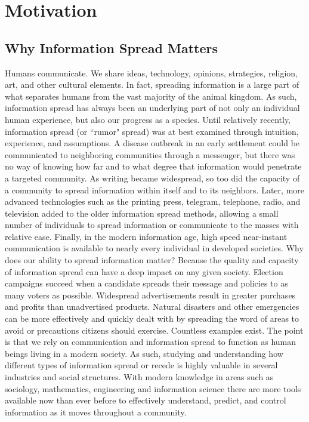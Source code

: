 \chapter{Motivation} \label{chapter_motivation}

\section{Why Information Spread Matters}
Humans communicate. We share ideas, technology, opinions, strategies, religion, art, and other cultural elements. In fact, spreading information is a large part of what separates humans from the vast majority of the animal kingdom. As such, information spread has always been an underlying part of not only an individual human experience, but also our progress as a species. Until relatively recently, information spread (or ``rumor" spread) was at best examined through intuition, experience, and assumptions. A disease outbreak in an early settlement could be communicated to neighboring communities through a messenger, but there was no way of knowing how far and to what degree that information would penetrate a targeted community. As writing became widespread, so too did the capacity of a community to spread information within itself and to its neighbors. Later, more advanced technologies such as the printing press, telegram, telephone, radio, and television added to the older information spread methods, allowing a small number of individuals to spread information or communicate to the masses with relative ease. Finally, in the modern information age, high speed near-instant communication is available to nearly every individual in developed societies. Why does our ability to spread information matter? Because the quality and capacity of information spread can have a deep impact on any given society. Election campaigns succeed when a candidate spreads their message and policies to as many voters as possible. Widespread advertisements result in greater purchases and profits than unadvertised products. Natural disasters and other emergencies can be more effectively and quickly dealt with by spreading the word of areas to avoid or precautions citizens should exercise. Countless examples exist. The point is that we rely on communication and information spread to function as human beings living in a modern society. As such, studying and understanding how different types of information spread or recede is highly valuable in several industries and social structures. With modern knowledge in areas such as sociology, mathematics, engineering and information science there are more tools available now than ever before to effectively understand, predict, and control information as it moves throughout a community.

